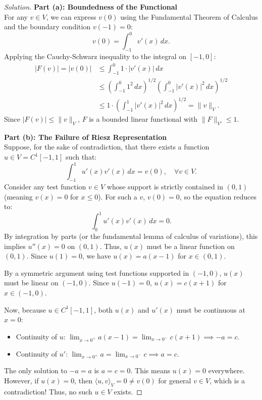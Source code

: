 \documentclass{article}
\begin{document}
\begin{proof}[Solution]
    \textbf{Part (a): Boundedness of the Functional} \\
    For any $v \in V$, we can express $v(0)$ using the Fundamental Theorem of Calculus and the boundary condition $v(-1) = 0$:
    \[ v(0) = \int_{-1}^0 v'(x) \, dx. \]
    Applying the Cauchy-Schwarz inequality to the integral on $[-1, 0]$:
    \begin{align*}
        |F(v)| = |v(0)| &\leq \int_{-1}^0 1 \cdot |v'(x)| \, dx \\
        &\leq \left( \int_{-1}^0 1^2 \, dx \right)^{1/2} \left( \int_{-1}^0 |v'(x)|^2 \, dx \right)^{1/2} \\
        &\leq 1 \cdot \left( \int_{-1}^1 |v'(x)|^2 \, dx \right)^{1/2} = \|v\|_V.
    \end{align*}
    Since $|F(v)| \leq \|v\|_V$, $F$ is a bounded linear functional with $\|F\|_{V'} \leq 1$.

    \vspace{1em}
    \textbf{Part (b): The Failure of Riesz Representation} \\
    Suppose, for the sake of contradiction, that there exists a function $u \in V = C^1[-1, 1]$ such that:
    \[ \int_{-1}^1 u'(x) v'(x) \, dx = v(0), \quad \forall v \in V. \]
    Consider any test function $v \in V$ whose support is strictly contained in $(0, 1)$ (meaning $v(x) = 0$ for $x \leq 0$). For such a $v$, $v(0) = 0$, so the equation reduces to:
    \[ \int_0^1 u'(x) v'(x) \, dx = 0. \]
    By integration by parts (or the fundamental lemma of calculus of variations), this implies $u''(x) = 0$ on $(0, 1)$. Thus, $u(x)$ must be a linear function on $(0, 1)$. Since $u(1) = 0$, we have $u(x) = a(x - 1)$ for $x \in (0, 1)$.
    
    By a symmetric argument using test functions supported in $(-1, 0)$, $u(x)$ must be linear on $(-1, 0)$. Since $u(-1) = 0$, $u(x) = c(x + 1)$ for $x \in (-1, 0)$.
    
    Now, because $u \in C^1[-1, 1]$, both $u(x)$ and $u'(x)$ must be continuous at $x = 0$:
    \begin{itemize}
        \item Continuity of $u$: $\lim_{x \to 0^+} a(x-1) = \lim_{x \to 0^-} c(x+1) \implies -a = c$.
        \item Continuity of $u'$: $\lim_{x \to 0^+} a = \lim_{x \to 0^-} c \implies a = c$.
    \end{itemize}
    The only solution to $-a = a$ is $a = c = 0$. This means $u(x) = 0$ everywhere. 
    However, if $u(x) = 0$, then $\langle u, v \rangle_V = 0 \neq v(0)$ for general $v \in V$, which is a contradiction! Thus, no such $u \in V$ exists.


\end{proof}
\end{document}
